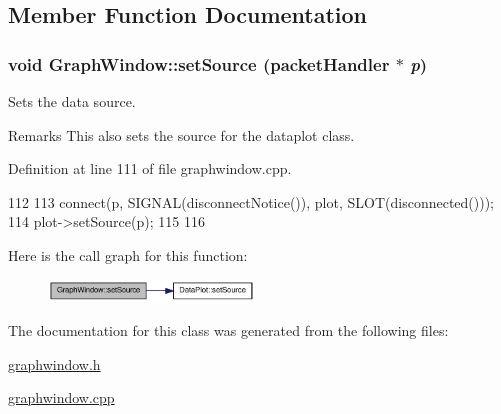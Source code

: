 \subsection{Member Function Documentation}
\hypertarget{classGraphWindow_a07a46e21184c287ba49db8145047e420}{
\subsubsection[{setSource}]{\setlength{\rightskip}{0pt plus 5cm}void GraphWindow::setSource ({\bf packetHandler} $\ast$ {\em p})}}
\label{classGraphWindow_a07a46e21184c287ba49db8145047e420}


Sets the data source. 

\begin{DoxyRemark}{Remarks}
This also sets the source for the dataplot class. 
\end{DoxyRemark}


Definition at line 111 of file graphwindow.cpp.




\begin{DoxyCode}
112 {
113     connect(p, SIGNAL(disconnectNotice()), plot, SLOT(disconnected()));
114     plot->setSource(p);
115 
116 }
\end{DoxyCode}




Here is the call graph for this function:\nopagebreak
\begin{figure}[H]
\begin{center}
\leavevmode
\includegraphics[width=155pt]{classGraphWindow_a07a46e21184c287ba49db8145047e420_cgraph}
\end{center}
\end{figure}




The documentation for this class was generated from the following files:\begin{DoxyCompactItemize}
\item 
\hyperlink{graphwindow_8h}{graphwindow.h}\item 
\hyperlink{graphwindow_8cpp}{graphwindow.cpp}\end{DoxyCompactItemize}
